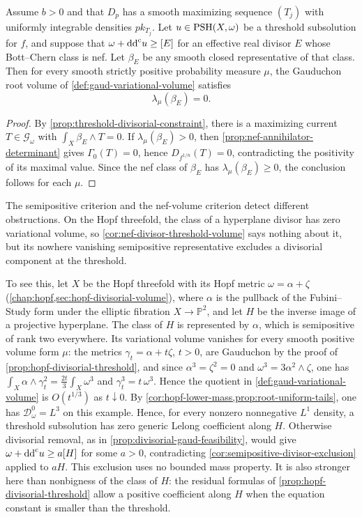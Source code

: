 \begin{corollary}\label{cor:nef-divisor-threshold-volume}
Assume $b>0$ and that $D_p$ has a smooth maximizing sequence $(T_j)$ with uniformly integrable densities $p k_{T_j}$. Let $u\in\mathrm{PSH}(X,\omega)$ be a threshold subsolution for $f$, and suppose that $\omega+\mathrm{dd}^{\mathrm{c}} u\geq[E]$ for an effective real divisor $E$ whose Bott--Chern class is nef. Let $\beta_E$ be any smooth closed representative of that class. Then for every smooth strictly positive probability measure $\mu$, the Gauduchon root volume of \cref{def:gaud-variational-volume} satisfies
\[
 \lambda_\mu(\beta_E)=0.
\]
\end{corollary}
\begin{proof}
By \cref{prop:threshold-divisorial-constraint}, there is a maximizing current $T\in\mathscr G_\omega$ with $\int_X\beta_E\wedge T=0$. If $\lambda_\mu(\beta_E)>0$, then \cref{prop:nef-annihilator-determinant} gives $\Gamma_0(T)=0$, hence $D_{f^{1/n}}(T)=0$, contradicting the positivity of its maximal value. Since the nef class of $\beta_E$ has $\lambda_\mu(\beta_E)\geq0$, the conclusion follows for each $\mu$.
\end{proof}

The semipositive criterion and the nef-volume criterion detect different obstructions. On the Hopf threefold, the class of a hyperplane divisor has zero variational volume, so \cref{cor:nef-divisor-threshold-volume} says nothing about it, but its nowhere vanishing semipositive representative excludes a divisorial component at the threshold.

To see this, let $X$ be the Hopf threefold with its Hopf metric $\omega=\alpha+\zeta$ (\cref{chap:hopf,sec:hopf-divisorial-volume}), where $\alpha$ is the pullback of the Fubini--Study form under the elliptic fibration $X\to\mathbb P^2$, and let $H$ be the inverse image of a projective hyperplane. The class of $H$ is represented by $\alpha$, which is semipositive of rank two everywhere. Its variational volume vanishes for every smooth positive volume form $\mu$: the metrics $\gamma_t=\alpha+t\zeta$, $t>0$, are Gauduchon by the proof of \cref{prop:hopf-divisorial-threshold}, and since $\alpha^3=\zeta^2=0$ and $\omega^3=3\alpha^2\wedge\zeta$, one has $\int_X\alpha\wedge\gamma_t^2=\tfrac{2t}{3}\int_X\omega^3$ and $\gamma_t^3=t\,\omega^3$. Hence the quotient in \cref{def:gaud-variational-volume} is $O(t^{1/3})$ as $t\downarrow0$. By \cref{cor:hopf-lower-mass,prop:root-uniform-tails}, one has $\mathcal D_\omega^0=L^3$ on this example. Hence, for every nonzero nonnegative $L^1$ density, a threshold subsolution has zero generic Lelong coefficient along $H$. Otherwise divisorial removal, as in \cref{prop:divisorial-gaud-feasibility}, would give $\omega+\mathrm{dd}^{\mathrm{c}} u\geq a[H]$ for some $a>0$, contradicting \cref{cor:semipositive-divisor-exclusion} applied to $aH$. This exclusion uses no bounded mass property. It is also stronger here than nonbigness of the class of $H$: the residual formulas of \cref{prop:hopf-divisorial-threshold} allow a positive coefficient along $H$ when the equation constant is smaller than the threshold.
